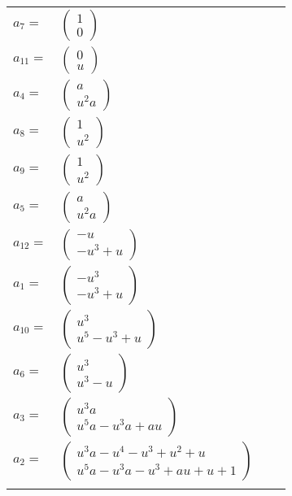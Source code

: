 \documentclass[1p]{elsarticle_modified}
\theoremstyle{definition}
\begin{document}
\begin{tabular}{m{7pt} m{180pt} m{7pt} m{180pt} }
\flushright $a_{7}=$&$\begin{pmatrix}1\\0\end{pmatrix}$ \\
\flushright $a_{11}=$&$\begin{pmatrix}0\\u\end{pmatrix}$ \\
\flushright $a_{4}=$&$\begin{pmatrix}a\\u^2 a\end{pmatrix}$ \\
\flushright $a_{8}=$&$\begin{pmatrix}1\\u^2\end{pmatrix}$ \\
\flushright $a_{9}=$&$\begin{pmatrix}1\\u^2\end{pmatrix}$ \\
\flushright $a_{5}=$&$\begin{pmatrix}a\\u^2 a\end{pmatrix}$ \\
\flushright $a_{12}=$&$\begin{pmatrix}- u\\- u^3+u\end{pmatrix}$ \\
\flushright $a_{1}=$&$\begin{pmatrix}- u^3\\- u^3+u\end{pmatrix}$ \\
\flushright $a_{10}=$&$\begin{pmatrix}u^3\\u^5- u^3+u\end{pmatrix}$ \\
\flushright $a_{6}=$&$\begin{pmatrix}u^3\\u^3- u\end{pmatrix}$ \\
\flushright $a_{3}=$&$\begin{pmatrix}u^3 a\\u^5 a- u^3 a+a u\end{pmatrix}$ \\
\flushright $a_{2}=$&$\begin{pmatrix}u^3 a- u^4- u^3+u^2+u\\u^5 a- u^3 a- u^3+a u+u+1\end{pmatrix}$\\&\end{tabular}
\end{document}
